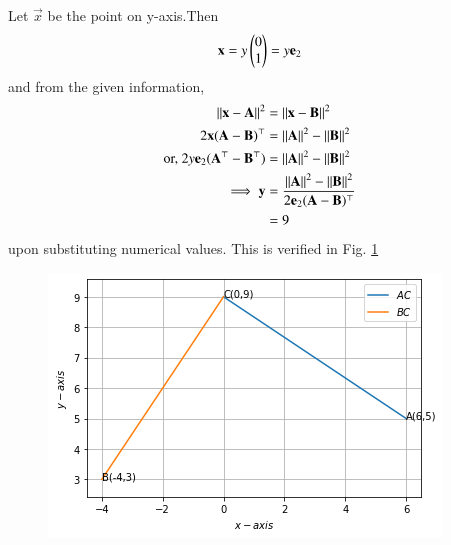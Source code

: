 Let $\vec{x}$ be the point on y-axis.Then
\begin{equation}
   \mathbf{x}= y\begin{pmatrix}0\\1\end{pmatrix}= y \mathbf{e}_2
\end{equation}
and from the given information,
\begin{align}
\left\lVert\mathbf{x}-\mathbf{A}\right\rVert^2 &=\left\lVert\mathbf{x}-\mathbf{B}\right\rVert^2 
\\
 \label{aug/2/25/eq:2}
2 \mathbf{x}(\mathbf{A}-\mathbf{B})^{\top}&=\left\lVert\mathbf{A}\right\rVert^2-\left\lVert\mathbf{B}\right\rVert^2
\\
\text{or, }
 2y\mathbf{e}_2(\mathbf{A}^{\top}-\mathbf{B}^{\top})&=\left\lVert\mathbf{A}\right\rVert^2-\left\lVert\mathbf{B}\right\rVert^2\\
 \implies \mathbf{y} &= \frac{\left\lVert\mathbf{A}\right\rVert^2 - \left\lVert\mathbf{B}\right\rVert^2}{2\mathbf{e}_2(\mathbf{A}-\mathbf{B})^{\top}}\\
 &= 9
\end{align}
upon substituting numerical values.
%     
This is verified in Fig. \ref{aug/2/25/Graphical solution}

\begin{figure}[ht]
    \centering
    \includegraphics[width=\columnwidth]{solutions/july/25/download.png}
    \caption{}
    \label{aug/2/25/Graphical solution}
\end{figure}